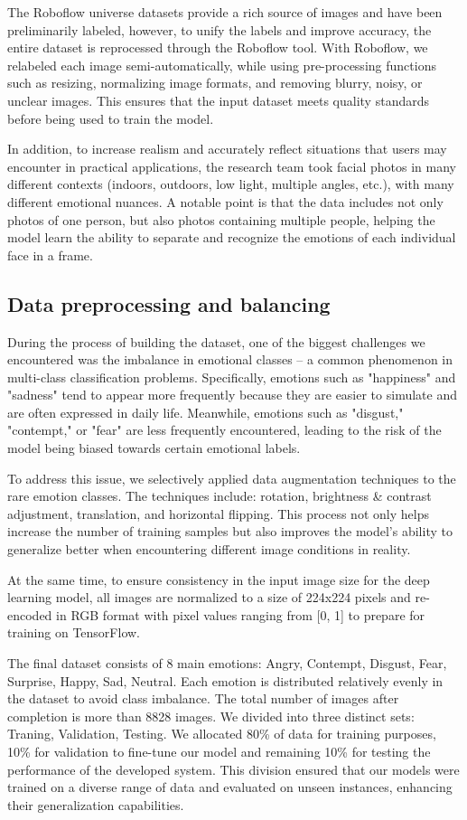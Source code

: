 \documentclass[a4paper,13pt]{report}
\begin{document}
The Roboflow universe datasets provide a rich source of images and have been preliminarily labeled, however, to unify the labels and improve accuracy, the entire dataset is reprocessed through the Roboflow tool. With Roboflow, we relabeled each image semi-automatically, while using pre-processing functions such as resizing, normalizing image formats, and removing blurry, noisy, or unclear images. This ensures that the input dataset meets quality standards before being used to train the model.

In addition, to increase realism and accurately reflect situations that users may encounter in practical applications, the research team took facial photos in many different contexts (indoors, outdoors, low light, multiple angles, etc.), with many different emotional nuances. A notable point is that the data includes not only photos of one person, but also photos containing multiple people, helping the model learn the ability to separate and recognize the emotions of each individual face in a frame.


\subsection{Data preprocessing and balancing}
During the process of building the dataset, one of the biggest challenges we encountered was the imbalance in emotional classes – a common phenomenon in multi-class classification problems. Specifically, emotions such as "happiness" and "sadness" tend to appear more frequently because they are easier to simulate and are often expressed in daily life. Meanwhile, emotions such as "disgust," "contempt," or "fear" are less frequently encountered, leading to the risk of the model being biased towards certain emotional labels.

To address this issue, we selectively applied data augmentation techniques to the rare emotion classes. The techniques include: rotation, brightness \& contrast adjustment, translation, and horizontal flipping. This process not only helps increase the number of training samples but also improves the model's ability to generalize better when encountering different image conditions in reality.

At the same time, to ensure consistency in the input image size for the deep learning model, all images are normalized to a size of 224x224 pixels and re-encoded in RGB format with pixel values ranging from [0, 1] to prepare for training on TensorFlow.

\newpage The final dataset consists of 8 main emotions: Angry, Contempt, Disgust, Fear, Surprise, Happy, Sad, Neutral. Each emotion is distributed relatively evenly in the dataset to avoid class imbalance. The total number of images after completion is more than 8828 images. We divided into three distinct sets: Traning, Validation, Testing. We allocated 80\% of data for training purposes, 10\% for validation to fine-tune our model and remaining 10\% for testing the performance of the developed system.  This division ensured that our models were trained on a diverse range of data and evaluated on unseen instances, enhancing their generalization capabilities.
\end{document}
